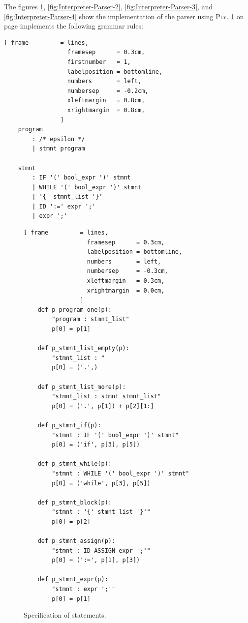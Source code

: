 \noindent
The figures \ref{fig:Interpreter-Parser-1}, \ref{fig:Interpreter-Parser-2}, \ref{fig:Interpreter-Parser-3}, and
\ref{fig:Interpreter-Parser-4} show the implementation of the parser using  \textsc{Ply}.
\ref{fig:Interpreter-Parser-1} on page \pageref{fig:Interpreter-Parser-1} implements the following grammar rules:

\begin{Verbatim}[ frame         = lines, 
                  framesep      = 0.3cm, 
                  firstnumber   = 1,
                  labelposition = bottomline,
                  numbers       = left,
                  numbersep     = -0.2cm,
                  xleftmargin   = 0.8cm,
                  xrightmargin  = 0.8cm,
                ]
    program
        : /* epsilon */
        | stmnt program
        
    stmnt 
        : IF '(' bool_expr ')' stmnt                 
        | WHILE '(' bool_expr ')' stmnt
        | '{' stmnt_list '}' 
        | ID ':=' expr ';'  
        | expr ';'       
\end{Verbatim}



\begin{figure}[!ht]
\centering
\begin{Verbatim}[ frame         = lines, 
                  framesep      = 0.3cm, 
                  labelposition = bottomline,
                  numbers       = left,
                  numbersep     = -0.3cm,
                  xleftmargin   = 0.3cm,
                  xrightmargin  = 0.0cm,
                ]
    def p_program_one(p):
        "program : stmnt_list"
        p[0] = p[1]
    
    def p_stmnt_list_empty(p):
        "stmnt_list : "
        p[0] = ('.',)
    
    def p_stmnt_list_more(p):
        "stmnt_list : stmnt stmnt_list"
        p[0] = ('.', p[1]) + p[2][1:]
    
    def p_stmnt_if(p):
        "stmnt : IF '(' bool_expr ')' stmnt"
        p[0] = ('if', p[3], p[5])   
    
    def p_stmnt_while(p):
        "stmnt : WHILE '(' bool_expr ')' stmnt"
        p[0] = ('while', p[3], p[5])
        
    def p_stmnt_block(p):
        "stmnt : '{' stmnt_list '}'"
        p[0] = p[2]
        
    def p_stmnt_assign(p):
        "stmnt : ID ASSIGN expr ';'"
        p[0] = (':=', p[1], p[3])
       
    def p_stmnt_expr(p):
        "stmnt : expr ';'"
        p[0] = p[1]
\end{Verbatim}
\vspace*{-0.3cm} %
\caption{Specification of statements.}
\label{fig:Interpreter-Parser-1}
\end{figure}


